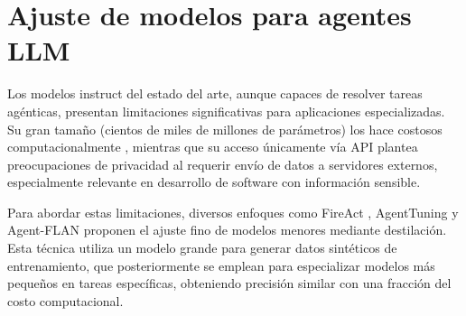 \section{Ajuste de modelos para agentes LLM}

Los modelos instruct del estado del arte, aunque capaces de resolver tareas agénticas, presentan limitaciones significativas para aplicaciones especializadas. Su gran tamaño (cientos de miles de millones de parámetros) los hace costosos computacionalmente \cite{noauthor_number_2024}, mientras que su acceso únicamente vía API plantea preocupaciones de privacidad al requerir envío de datos a servidores externos, especialmente relevante en desarrollo de software con información sensible.

Para abordar estas limitaciones, diversos enfoques como FireAct \cite{chen_fireact_2023}, AgentTuning \cite{zeng_agenttuning_2024} y Agent-FLAN \cite{chen_agent-flan_2024} proponen el ajuste fino de modelos menores mediante destilación. Esta técnica utiliza un modelo grande para generar datos sintéticos de entrenamiento, que posteriormente se emplean para especializar modelos más pequeños en tareas específicas, obteniendo precisión similar con una fracción del costo computacional.
